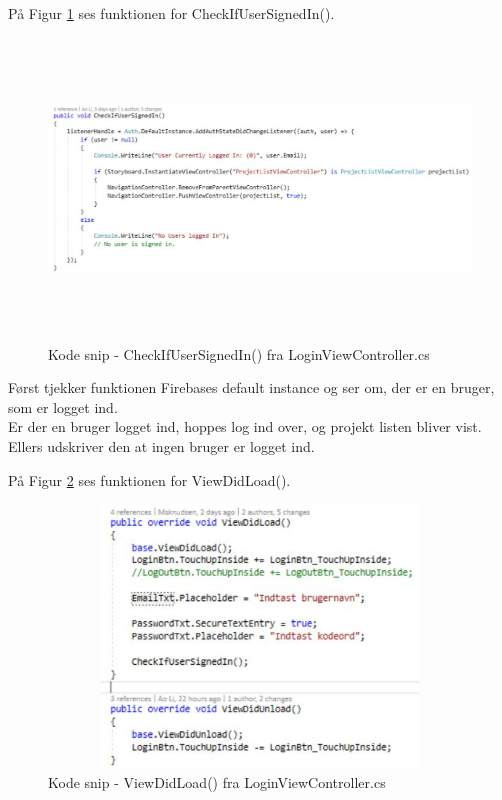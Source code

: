 På Figur \ref{fig:Checkifusersigned} ses funktionen for CheckIfUserSignedIn().
\begin{figure}[H] %
	\centering
	\includegraphics[height=8cm, width=15cm]{../ArkitekturDesign/Design/Login/Checkifusersigned}
	\caption{Kode snip - CheckIfUserSignedIn() fra LoginViewController.cs}
	\label{fig:Checkifusersigned}
\end{figure}
Først tjekker funktionen Firebases default instance og ser om, der er en bruger, som er logget ind. \\
Er der en bruger logget ind, hoppes log ind over, og projekt listen bliver vist. \\
Ellers udskriver den at ingen bruger er logget ind.

På Figur \ref{fig:ViewDidLoadLogin} ses funktionen for ViewDidLoad().
\begin{figure}[H] %
	\centering
	\includegraphics[height=7cm, width=12cm]{../ArkitekturDesign/Design/Login/ViewDidLoad}
	\caption{Kode snip - ViewDidLoad() fra LoginViewController.cs}
	\label{fig:ViewDidLoadLogin}
\end{figure}

